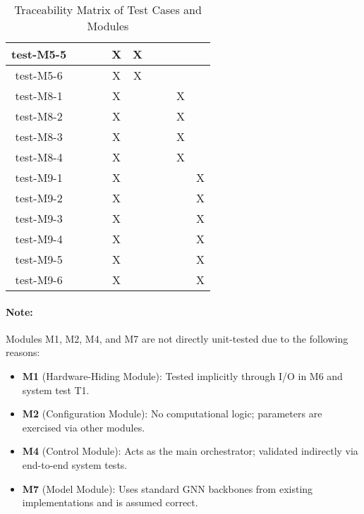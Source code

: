 \documentclass[12pt, titlepage]{article}
\begin{document}
\begin{table}[h!]
\begin{tabular}{|c|c|c|c|c|c|c|c|c|c|}
  test-M5-5   &     &     &     &  X   & X   &     &     &     &     \\ \hline
  test-M5-6   &     &     &     &  X   & X   &     &     &     &     \\ \hline
  test-M8-1   &     &     &     &  X   &     &     &     & X   &     \\ \hline
  test-M8-2   &     &     &     &  X   &     &     &     & X   &     \\ \hline
  test-M8-3   &     &     &     &  X   &     &     &     & X   &     \\ \hline
  test-M8-4   &     &     &     &  X   &     &     &     & X   &     \\ \hline
  test-M9-1   &     &     &     &  X   &     &     &     &     & X   \\ \hline
  test-M9-2   &     &     &     &  X   &     &     &     &     & X   \\ \hline
  test-M9-3   &     &     &     &  X   &     &     &     &     & X   \\ \hline
  test-M9-4   &     &     &     &  X   &     &     &     &     & X   \\ \hline
  test-M9-5   &     &     &     &  X   &     &     &     &     & X   \\ \hline
  test-M9-6   &     &     &     &  X   &     &     &     &     & X   \\ \hline
  \end{tabular}
  \caption{Traceability Matrix of Test Cases and Modules}
  \label{Table:trace-test-modules}
\end{table}

\paragraph{Note:}
Modules M1, M2, M4, and M7 are not directly unit-tested due to the following reasons:

\begin{itemize}
  \item \textbf{M1} (Hardware-Hiding Module): Tested implicitly through I/O in M6 and system test T1.
  \item \textbf{M2} (Configuration Module): No computational logic; parameters are exercised via other modules.
  \item \textbf{M4} (Control Module): Acts as the main orchestrator; validated indirectly via end-to-end system tests.
  \item \textbf{M7} (Model Module): Uses standard GNN backbones from existing implementations and is assumed correct.
\end{itemize}
\end{document}
